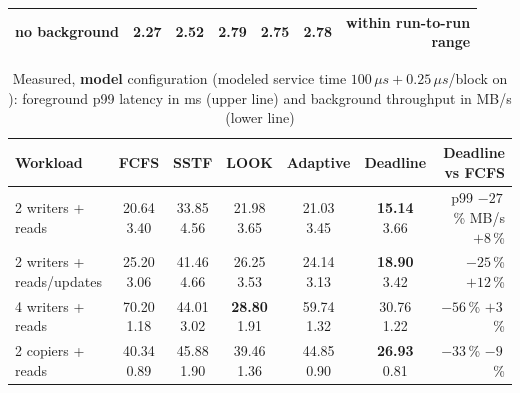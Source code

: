 \documentclass[12pt,a4paper]{article}
\renewcommand{\arraystretch}{1.18}
\DeclareRobustCommand{\code}[1]{\texttt{\detokenize{#1}}}
\begin{document}
\begin{table}[!htbp]
\begin{tabular}{@{}l c c c c c r@{}}
no background & 2.27 & 2.52 & 2.79 & 2.75 & 2.78 & \makecell[r]{within run-to-run\\range} \\
\bottomrule
\end{tabular}
\end{table}

\begin{table}[!htbp]
\centering
\caption[Measured p99 and throughput, model configuration]{Measured, \textbf{model} configuration (modeled service time $100\,\mu s + 0.25\,\mu s$/block on \code{O_DIRECT}): foreground p99 latency in ms (upper line) and background throughput in MB/s (lower line)}
\label{tab:model}
\footnotesize
\setlength{\tabcolsep}{3.5pt}
\renewcommand{\arraystretch}{1.45}
\begin{tabular}{@{}l c c c c c r@{}}
\toprule
\textbf{Workload} & \textbf{FCFS} & \textbf{SSTF} & \textbf{LOOK} & \textbf{Adaptive} & \textbf{Deadline} & \makecell[r]{\textbf{Deadline}\\\textbf{vs FCFS}} \\
\midrule
2 writers + reads & \makecell{20.64\\3.40} & \makecell{33.85\\4.56} & \makecell{21.98\\3.65} & \makecell{21.03\\3.45} & \makecell{\textbf{15.14}\\3.66} & \makecell[r]{p99 $-27$\,\%\\MB/s $+8$\,\%} \\
2 writers + reads/updates & \makecell{25.20\\3.06} & \makecell{41.46\\4.66} & \makecell{26.25\\3.53} & \makecell{24.14\\3.13} & \makecell{\textbf{18.90}\\3.42} & \makecell[r]{$-25$\,\%\\$+12$\,\%} \\
4 writers + reads & \makecell{70.20\\1.18} & \makecell{44.01\\3.02} & \makecell{\textbf{28.80}\\1.91} & \makecell{59.74\\1.32} & \makecell{30.76\\1.22} & \makecell[r]{$-56$\,\%\\$+3$\,\%} \\
2 copiers + reads & \makecell{40.34\\0.89} & \makecell{45.88\\1.90} & \makecell{39.46\\1.36} & \makecell{44.85\\0.90} & \makecell{\textbf{26.93}\\0.81} & \makecell[r]{$-33$\,\%\\$-9$\,\%} \\

\end{tabular}
\end{table}
\end{document}
